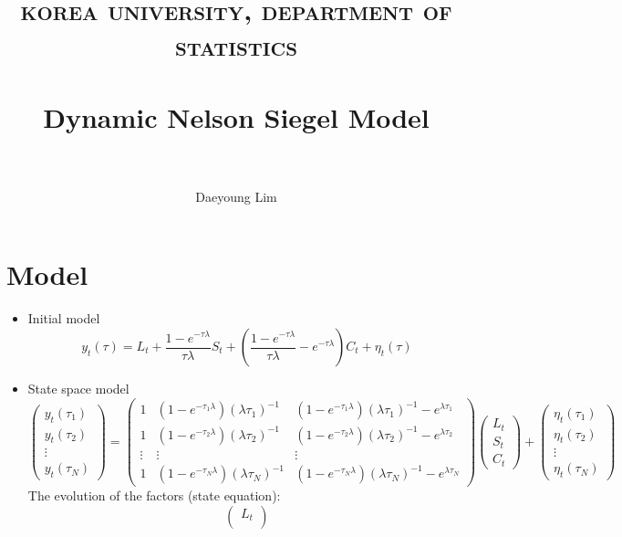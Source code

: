 \documentclass[11pt]{article}
\title{ 
\normalfont \normalsize 
\textsc{korea university, department of statistics} \\ [1pt] %
\horrule{0.5pt} \\[0.05cm]%
\Large Dynamic Nelson Siegel Model \\ %
\horrule{1pt} \\%
}
\author{Daeyoung Lim} %
\date{}
\numberwithin{equation}{section} %
\numberwithin{figure}{section} %
\numberwithin{table}{section} %
\begin{document}
\maketitle
\section{Model}
\begin{itemize}
	\item Initial model
	\begin{equation}
	y_{t}(\tau) = L_{t}+\dfrac{1-e^{-\tau\lambda}}{\tau\lambda}S_{t}+\left(\dfrac{1-e^{-\tau\lambda}}{\tau\lambda}-e^{-\tau\lambda}\right)C_{t}+\eta_{t}(\tau)
	\end{equation}
	\item State space model
	\begin{equation}
		\begin{pmatrix}
			y_{t}(\tau_{1})\\
			y_{t}(\tau_{2})\\
			\vdots\\
			y_{t}(\tau_{N})
		\end{pmatrix}=
		\begin{pmatrix}
			1 & (1-e^{-\tau_{1}\lambda})(\lambda\tau_{1})^{-1} & (1-e^{-\tau_{1}\lambda})(\lambda\tau_{1})^{-1}-e^{\lambda\tau_{1}}\\
			1 & (1-e^{-\tau_{2}\lambda})(\lambda\tau_{2})^{-1} & (1-e^{-\tau_{2}\lambda})(\lambda\tau_{2})^{-1}-e^{\lambda\tau_{2}}\\
			\vdots & \vdots & \vdots \\
			1 & (1-e^{-\tau_{N}\lambda})(\lambda\tau_{N})^{-1} & (1-e^{-\tau_{N}\lambda})(\lambda\tau_{N})^{-1}-e^{\lambda\tau_{N}}
		\end{pmatrix}\begin{pmatrix}
			L_{t}\\
			S_{t}\\
			C_{t}
		\end{pmatrix}+ \begin{pmatrix}
			\eta_{t}(\tau_{1})\\
			\eta_{t}(\tau_{2})\\
			\vdots\\
			\eta_{t}(\tau_{N})
		\end{pmatrix}
	\end{equation}
	The evolution of the factors (state equation):
	\begin{equation}
		\begin{pmatrix}
			L_{t}\\

\end{pmatrix}
\end{equation}
\end{itemize}
\end{document}
